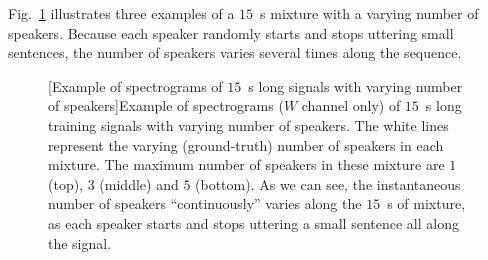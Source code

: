 Fig.~\ref{fig:spectrogramsWithVaryingNOS} illustrates three examples of a $15$~s mixture with a varying number of speakers. Because each speaker randomly starts and stops uttering small sentences, the number of speakers varies several times along the sequence.

\begin{figure}[t]
    \begin{center}
    [Example of spectrograms of $15$~s long signals with varying number of speakers]{Example of spectrograms ($W$ channel only) of $15$~s long training signals with varying number of speakers. The white lines represent the varying (ground-truth) number of speakers in each mixture. The maximum number of speakers in these mixture are $1$ (top), $3$ (middle) and $5$ (bottom). As we can see, the instantaneous number of speakers ``continuously'' varies along the $15$~s of mixture, as each speaker starts and stops uttering a small sentence all along the signal.}
    \label{fig:spectrogramsWithVaryingNOS}
    \end{center}
\end{figure}

